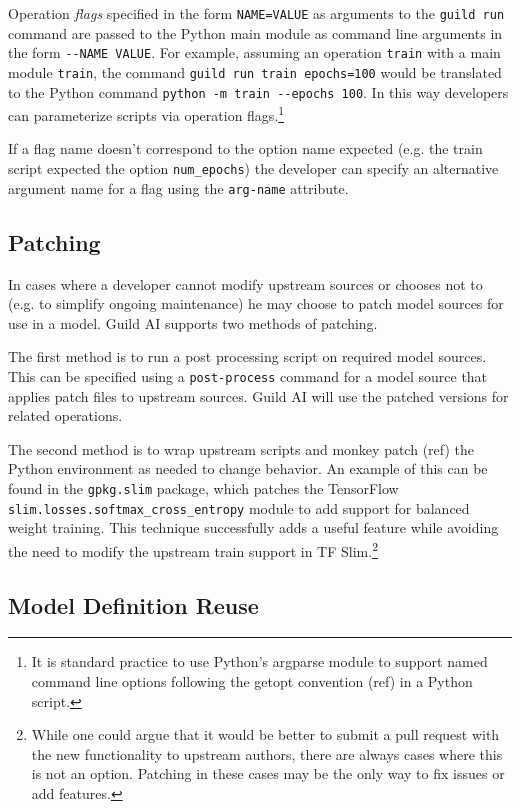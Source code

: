 \documentclass{article}
\begin{document}
Operation \emph{flags} specified in the form \verb|NAME=VALUE| as
arguments to the \verb|guild run| command are passed to the Python
main module as command line arguments in the form
\verb|--NAME VALUE|. For example, assuming an operation \verb|train|
with a main module \verb|train|, the command
\verb|guild run train epochs=100| would be translated to the Python
command \verb|python -m train --epochs 100|. In this way developers
can parameterize scripts via operation flags.\footnote{It is standard
  practice to use Python's argparse module to support named command
  line options following the getopt convention (ref) in a Python
  script.}

If a flag name doesn't correspond to the option name expected
(e.g. the train script expected the option \verb|num_epochs|) the
developer can specify an alternative argument name for a flag using
the \verb|arg-name| attribute.

\subsection{Patching}

In cases where a developer cannot modify upstream sources or chooses
not to (e.g. to simplify ongoing maintenance) he may choose to patch
model sources for use in a model. Guild AI supports two methods of
patching.

The first method is to run a post processing script on required model
sources. This can be specified using a \verb|post-process| command for
a model source that applies patch files to upstream sources. Guild AI
will use the patched versions for related operations.

The second method is to wrap upstream scripts and monkey patch (ref)
the Python environment as needed to change behavior. An example of
this can be found in the \verb|gpkg.slim| package, which patches the
TensorFlow \verb|slim.losses.softmax_cross_entropy| module to add
support for balanced weight training. This technique successfully adds
a useful feature while avoiding the need to modify the upstream train
support in TF Slim.\footnote{While one could argue that it would be
  better to submit a pull request with the new functionality to
  upstream authors, there are always cases where this is not an
  option. Patching in these cases may be the only way to fix issues or
  add features.}

\subsection{Model Definition Reuse}
\end{document}
